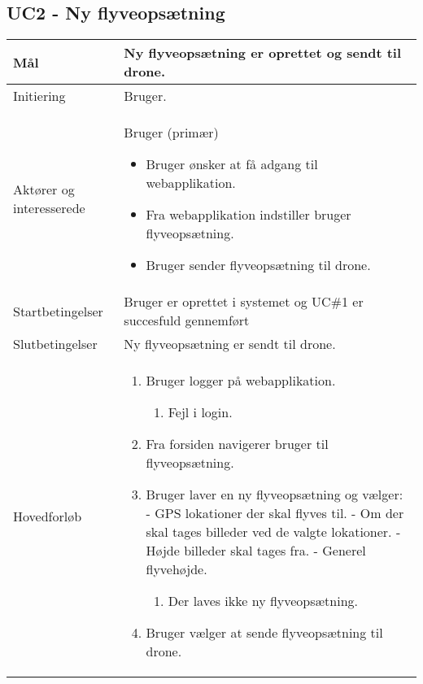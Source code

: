 \subsection*{UC2 - Ny flyveopsætning}

\begin{table}[H]
\begin{tabular}{| p{3cm}| p{11.5cm}|}
\hline

Mål	 							& Ny flyveopsætning er oprettet og sendt til drone. \\\hline
Initiering							& Bruger. \\\hline
Aktører og \newline interesserede			& Bruger (primær) 
										\begin{itemize}
											\item Bruger ønsker at få adgang til webapplikation.
											\item Fra webapplikation indstiller bruger flyveopsætning.
											\item Bruger sender flyveopsætning til drone.
										\end{itemize} \\ \hline
									  
Startbetingelser						& Bruger er oprettet i systemet og UC\#1 er succesfuld gennemført  \\\hline
Slutbetingelser						& Ny flyveopsætning er sendt til drone. \\\hline
Hovedforløb				&
 
									\renewcommand{\labelenumi}{\arabic{enumi}.}
									\renewcommand{\labelenumii}{\Roman{enumii}:}

									\begin{enumerate}[topsep=0.0cm, leftmargin=0.5cm]
										\item Bruger logger på webapplikation.
										\begin{enumerate}[partopsep=4cm, topsep=0cm, leftmargin=1cm]
												\item Fejl i login.
												
										\end{enumerate}
										\item Fra forsiden navigerer bruger til flyveopsætning.
										\item Bruger laver en ny flyveopsætning og vælger:	\newline	
											  - GPS lokationer der skal flyves til. \newline
											  - Om der skal tages billeder ved de valgte lokationer. \newline 
											  - Højde billeder skal tages fra. \newline
											  - Generel flyvehøjde.  		
										\begin{enumerate}[partopsep=4cm, topsep=0cm, leftmargin=1cm]
												\item Der laves ikke ny flyveopsætning.
										\end{enumerate}
										\item Bruger vælger at sende flyveopsætning til drone.
									\end{enumerate} \\\hline	


\end{tabular}
\end{table}
